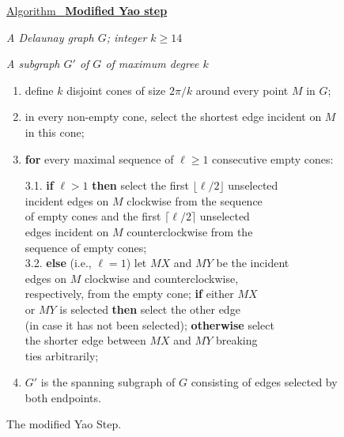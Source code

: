 \documentclass{stacs_proc}
\theoremstyle{plain}\newtheorem{satz}[thm]{Satz}
\newlength{\alginputwidth}
\newlength{\algboxwidth}
\newcommand{\alginput}[1]{\makebox[1.5cm][l]{ {\sc Input:}} \parbox[t]{\alginputwidth}{{\it #1}}}
\newcommand{\algoutput}[1]{\makebox[1.5cm][l]{ {\sc Output:}} \parbox[t]{\alginputwidth}{{\it #1}}}
\newcommand{\algtitle}[1]{\underline{Algorithm \ {\bf #1}} \vspace*{1mm}\\}
\newenvironment{algorthm}[2]{
	\setlength{\algboxwidth}{\columnwidth}
	\addtolength{\algboxwidth}{-\columnsep}
	\addtolength{\algboxwidth}{-1mm}
	\setlength{\alginputwidth}{\algboxwidth}
	\addtolength{\alginputwidth}{-1.7cm}
	\begin{figure}[tb]
	    \vspace*{2mm}
	    \centering
	    \begin{lrbox}{\captionbox}
		\begin{minipage}[b]{\algboxwidth}
		    \centering
		    \caption{#1}
		    \label{#2}
		\end{minipage}
	    \end{lrbox}
	    \begin{lrbox}{\algbox}
		\begin{minipage}[b]{\algboxwidth}
		    \footnotesize
		    \vspace*{2mm}
    } {
		    \vspace*{0.2mm}
	       \end{minipage}
	    \end{lrbox}
	    \fbox{\usebox{\algbox}\hspace*{1mm}}
	    \usebox{\captionbox}
	    \vspace*{-4mm}
	\end{figure}
    }
\newenvironment{codeblock}{
	\begin{enumerate}
	    \setlength{\itemsep}{2pt}
	    \setlength{\parsep}{0pt}
	    \setlength{\topsep}{0pt}
	    \setlength{\parskip}{0pt}
	    \setlength{\partopsep}{0pt}
    } {\end{enumerate}}
\newcommand{\step}{\item}
\begin{document}
\begin{algorthm}{The modified Yao Step.}{yaostep} \algtitle{Modified Yao step}
\alginput{A Delaunay graph $G$; integer $k \geq 14$} \algoutput{A
subgraph $G'$ of $G$ of maximum degree $k$}
\begin{codeblock}

\step define $k$ disjoint cones of size $2\pi/k$ around every point
$M$ in $G$;

\step  in every non-empty cone, select the shortest edge incident on
$M$ in this cone;

\step {\bf for} every maximal sequence of $\ell \geq 1$ consecutive
empty cones:

\hspace*{3mm} 3.1. {\bf if} $\ell > 1$ {\bf then} select the first
$\lfloor \ell/2 \rfloor$ unselected  \\
\hspace*{7.9mm}   incident edges on $M$ clockwise from the sequence
\\ \hspace*{7.9mm} of empty cones and the first $\lceil \ell/2 \rceil$ unselected  \\ \hspace*{7.9mm} edges
incident on $M$ counterclockwise from the \\
\hspace*{7.9mm} sequence  of empty cones; \\
\hspace*{3mm} 3.2. {\bf else} (i.e., $\ell = 1$) let $MX$ and $MY$
be the incident  \\ \hspace*{7.9mm} edges on $M$ clockwise and
counterclockwise,  \\ \hspace*{7.9mm} respectively, from the empty
cone; {\bf if} either $MX$ \\ \hspace*{7.9mm} or $MY$ is selected
{\bf then}  select the other edge  \\
\hspace*{7.9mm} (in case it has not been selected); {\bf otherwise} select\\
\hspace*{7.9mm}  the shorter edge between $MX$ and
 $MY$ breaking \\ \hspace*{7.9mm} ties arbitrarily;

\step $G'$ is the spanning subgraph of $G$ consisting of edges selected by
both endpoints.
\end{codeblock}
\end{algorthm}
\end{document}
